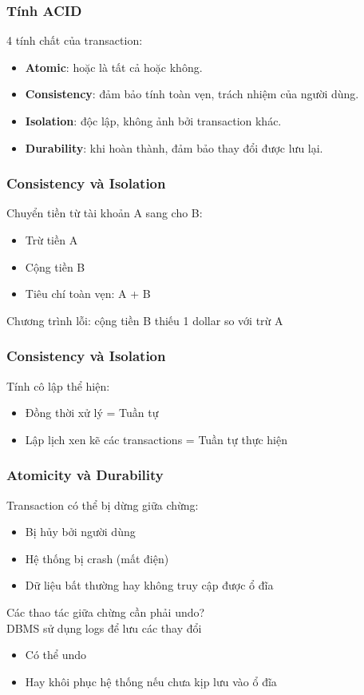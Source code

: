 \documentclass[xcolor={table, dvipsnames}]{beamer}
\begin{document}
\begin{frame}
\frametitle{Tính ACID}
4 tính chất của transaction:
\begin{itemize}
\item \textbf{Atomic}: hoặc là tất cả hoặc không.
\item \textbf{Consistency}: đảm bảo tính toàn vẹn, trách nhiệm của người dùng.
\item \textbf{Isolation}: độc lập, không ảnh bởi transaction khác.
\item \textbf{Durability}: khi hoàn thành, đảm bảo thay đổi được lưu lại.
\end{itemize}

\end{frame}

\begin{frame}
\frametitle{Consistency và Isolation}
Chuyển tiền từ tài khoản A sang cho B:
\begin{itemize}
\item Trừ tiền A
\item Cộng tiền B
\item Tiêu chí toàn vẹn: A + B
\end{itemize}
Chương trình lỗi: cộng tiền B thiếu 1 dollar so với trừ A
\end{frame}

\begin{frame}
\frametitle{Consistency và Isolation}
Tính cô lập thể hiện:
\begin{itemize}
\item Đồng thời xử lý = Tuần tự
\item Lập lịch xen kẽ các transactions = Tuần tự thực hiện
\end{itemize}
\end{frame}

\begin{frame}
\frametitle{Atomicity và Durability}
Transaction có thể bị dừng giữa chừng:
\begin{itemize}
\item Bị hủy bởi người dùng
\item Hệ thống bị crash (mất điện)
\item Dữ liệu bất thường hay không truy cập được ổ đĩa
\end{itemize}
Các thao tác giữa chừng cần phải undo?\\
DBMS sử dụng logs để lưu các thay đổi
\begin{itemize}
\item Có thể undo
\item Hay khôi phục hệ thống nếu chưa kịp lưu vào ổ đĩa
\end{itemize}
\end{frame}
\end{document}
